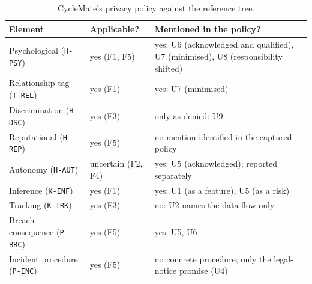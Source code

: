 \begin{table}[H]
\centering
\caption{CycleMate's privacy policy against the reference tree.}
\label{tab:we-app}
\small
\begin{tabularx}{\textwidth}{@{}>{\raggedright\arraybackslash}p{3.0cm}
                                 >{\raggedright\arraybackslash}p{2.6cm}
                                 >{\raggedright\arraybackslash}X@{}}
\toprule
\textbf{Element} & \textbf{Applicable?} & \textbf{Mentioned in the policy?} \\
\midrule
Psychological (\texttt{H-PSY}) & yes (F1, F5)
  & yes: U6 (acknowledged and qualified), U7 (minimised), U8 (responsibility
    shifted) \\
Relationship tag (\texttt{T-REL}) & yes (F1) & yes: U7 (minimised) \\
Discrimination (\texttt{H-DSC}) & yes (F3) & only as denied: U9 \\
Reputational (\texttt{H-REP}) & yes (F5)
  & no mention identified in the captured policy \\
Autonomy (\texttt{H-AUT}) & uncertain (F2, F4)
  & yes: U5 (acknowledged); reported separately \\
\addlinespace
Inference (\texttt{K-INF}) & yes (F1) & yes: U1 (as a feature), U5 (as a risk) \\
Tracking (\texttt{K-TRK}) & yes (F3) & no: U2 names the data flow only \\
Breach consequence (\texttt{P-BRC}) & yes (F5) & yes: U5, U6 \\
Incident procedure (\texttt{P-INC}) & yes (F5)
  & no concrete procedure; only the legal-notice promise (U4) \\
\bottomrule
\end{tabularx}
\end{table}

